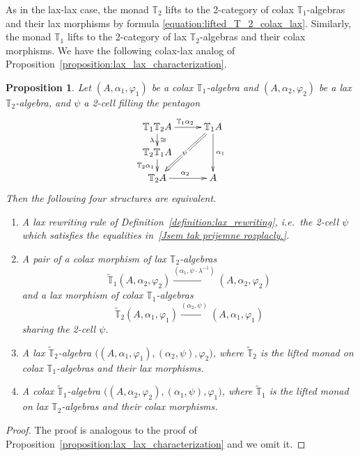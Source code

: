 \documentclass[12pt,leqno]{amsart}
\newtheorem{proposition}[theorem]{Proposition}
\theoremstyle{definition}
\def\T{\mathbb{T}}
\newcommand{\4}{\texttt{4}}
\renewcommand{\phi}{\varphi}
\begin{document}
As in the lax-lax case, the monad $\T_2$ lifts to the 2-category of
colax $\T_1$-algebras and their lax morphisms by formula
\eqref{equation:lifted_T_2_colax_lax}. Similarly, the monad
$\T_1$ lifts to the 2-category of lax $\T_2$-algebras and their colax
morphisms. We have the
following colax-lax  
analog of Proposition~\ref{proposition:lax_lax_characterization}.

\begin{proposition}
\label{Dnes vecere u indianu.}
Let $(A, \alpha_1,\phi_1)$ be a colax $\T_1$-algebra and $(A,
\alpha_2,\phi_2)$ be a lax $\T_2$-algebra, and $\psi$ a 2-cell 
filling the pentagon
\begin{equation}
\xymatrix@C=2.7em@R=1.2em{
\T_1\T_2 A \ar[r]^{\T_1\alpha_2} \ar[d]_\lambda^\cong    
& \T_1 A \ar[dd]^{\alpha_1}   \ar@{=>}[ddl]|{\psi\rule{.1em}{0pt}}
\\
\T_2 \T_1 A
\ar[d]_{\T_2\alpha_1} 
\\
\T_2A   \ar[r]^{\alpha_2}    &A 
}
\end{equation}
Then the following four structures are equivalent.
\begin{enumerate}[topsep=0pt, partopsep=0pt, itemsep=0pt, itemindent=-1em]
\item 
A lax rewriting rule of
Definition~\ref{definition:lax_rewriting}, 
i.e.~the 2-cell $\psi$  which satisfies 
the equalities in~\eqref{Jsem tak prijemne rozplacly.}.
\item 
A pair of a colax morphism of lax $\T_2$-algebras
\[
\widetilde{\T}_1(A,
\alpha_2,\phi_2)\xrightarrow{(\alpha_1,\psi\cdot \lambda^{-1})}(A, \alpha_2,\phi_2)
\]
and a lax morphism of colax $\T_1$-algebras 
\[\widetilde{\T}_2(A, \alpha_1,\phi_1)\xrightarrow{(\alpha_2,\psi)}(A, \alpha_1,\phi_1)\]
sharing the 2-cell $\psi$.
  \item 
    A lax $\widetilde{\T}_2$-algebra $\big((A,\alpha_1,\phi_1),(\alpha_2,\psi),\phi_2\big)$, where $\widetilde{\T}_2$ is the lifted monad on colax $\T_1$-alge\-bras and their lax morphisms.
    \item 
    A colax $\widetilde{\T}_1$-algebra $\big((A,\alpha_2,\phi_2),(\alpha_1,\psi),\phi_1\big)$, where $\widetilde{\T}_1$ is the lifted monad on lax $\T_2$-alge\-bras and their colax morphisms.
\end{enumerate}
\end{proposition}

\begin{proof}
The proof is analogous to the proof of
Proposition~\ref{proposition:lax_lax_characterization} and we omit it. 
\end{proof}
\end{document}
